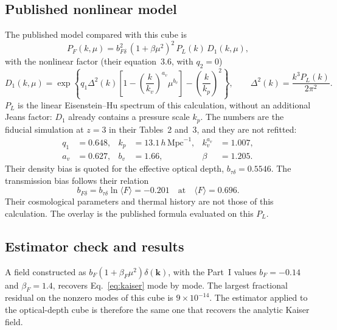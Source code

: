 \documentclass[11pt]{article}
\begin{document}
\subsection{Published nonlinear model}

The published model compared with this cube is \citep{Arinyo-i-Prats:2015vqa}
\begin{equation}
\label{eq:arinyo}
P_F(k,\mu)
=
b_{F\delta}^{2}\,(1+\beta\mu^{2})^{2}\,P_L(k)\,D_1(k,\mu),
\end{equation}
with the nonlinear factor (their equation~3.6, with $q_2=0$)
\begin{equation}
\label{eq:d1}
D_1(k,\mu)
=
\exp\left\{
q_1\Delta^{2}(k)
\left[1-\left(\frac{k}{k_v}\right)^{a_v}\mu^{b_v}\right]
-
\left(\frac{k}{k_p}\right)^{2}
\right\},
\qquad
\Delta^{2}(k)=\frac{k^{3}P_L(k)}{2\pi^{2}}.
\end{equation}
$P_L$ is the linear Eisenstein--Hu spectrum of this calculation, without an additional Jeans factor: $D_1$ already contains a pressure scale $k_p$.
The numbers are the fiducial simulation at $z=3$ in their Tables~2 and~3, and they are not refitted:
\begin{equation}
\begin{aligned}
q_1 &= 0.648, &
k_p &= 13.1\,h\,\mathrm{Mpc}^{-1}, &
k_v^{a_v} &= 1.007, \\
a_v &= 0.627, &
b_v &= 1.66, &
\beta &= 1.205.
\end{aligned}
\end{equation}
Their density bias is quoted for the effective optical depth, $b_{\tau\delta}=0.5546$.
The transmission bias follows their relation
\begin{equation}
\label{eq:btau}
b_{F\delta}=b_{\tau\delta}\ln\langle F\rangle=-0.201
\quad\text{at}\quad
\langle F\rangle=0.696.
\end{equation}
Their cosmological parameters and thermal history are not those of this calculation.
The overlay is the published formula evaluated on this $P_L$.

\subsection{Estimator check and results}

A field constructed as $b_F(1+\beta_F\mu^{2})\delta(\mathbf{k})$, with the Part~I values $b_F=-0.14$ and $\beta_F=1.4$, recovers Eq.~\eqref{eq:kaiser} mode by mode.
The largest fractional residual on the nonzero modes of this cube is $9\times 10^{-14}$.
The estimator applied to the optical-depth cube is therefore the same one that recovers the analytic Kaiser field.
\end{document}
